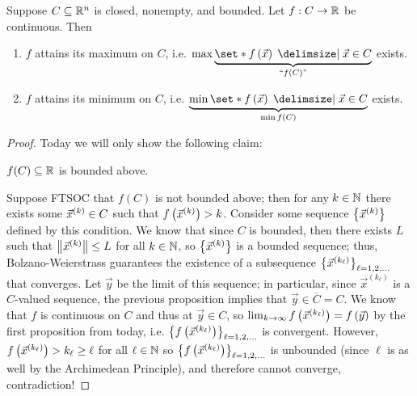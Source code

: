 \documentclass[main.tex]{subfiles}
\begin{document}
\begin{theorem}
    Suppose $C\subseteq \mathbb R^n$ is closed, nonempty, and bounded. Let $f : C\to \mathbb R$ be continuous. Then
    \begin{enumerate}
        \item $f$ attains its maximum on $C$, i.e. $\max\underbrace{\set*{f\parens{\vec{x}} \mid \vec{x} \in C}}_{``f(C)"}$ exists.
        \item $f$ attains its minimum on $C$, i.e. $\underbrace{\min\set*{f\parens{\vec{x}} \mid \vec{x} \in C}}_{\min f(C)}$ exists.
    \end{enumerate}
\end{theorem}
\begin{proof}
    Today we will only show the following claim:
    \begin{claim}
        $f(C)\subseteq\mathbb R$ is bounded above.
    \end{claim}
    Suppose FTSOC that $f(C)$ is not bounded above; then for any $k\in \mathbb N$ there exists some $\vec{x}^{(k)}\in C$ such that $f\left( \vec{x}^{(k)} \right) > k$. Consider some sequence $\left\{ \vec{x}^{(k)} \right\}$ defined by this condition. We know that since $C$ is bounded, then there exists $L$ such that $\left\lVert \vec{x}^{(k)} \right\rVert \le L$ for all $k\in \mathbb N$, so $\left\{ \vec{x}^{(k)} \right\}$ is a bounded sequence; thus, Bolzano-Weierstrass guarantees the existence of a subsequence $\left\{ \vec{x}^{(k_\ell)} \right\}_{\ell = 1, 2, \ldots}$ that converges. Let $\vec{y}$ be the limit of this sequence; in particular, since $\vec{x}^{(k_\ell)}$ is a $C$-valued sequence, the previous proposition implies that $\vec{y}\in \overline{C} = C$. We know that $f$ is continuous on $C$ and thus at $\vec{y}\in C$, so $\lim_{k\to \infty} f\left( \vec{x}^{(k_\ell)} \right) = f\left( \vec{y} \right)$ by the first proposition from today, i.e. $\left\{ f\left( \vec{x}^{(k_\ell)} \right) \right\}_{\ell = 1, 2, \ldots}$ is convergent. However, $f\left( \vec{x}^{(k_\ell)} \right)> k_\ell \ge \ell$ for all $\ell\in \mathbb N$ so $\left\{ f\left( \vec{x}^{(k_\ell)} \right) \right\}_{\ell = 1, 2, \ldots}$ is unbounded (since $\ell$ is as well by the Archimedean Principle), and therefore cannot converge, contradiction!
\end{proof}
\end{document}
